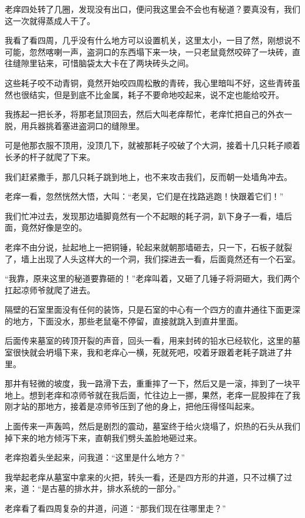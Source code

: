 老痒四处转了几圈，发现没有出口，便问我这里会不会也有秘道？要真没有，我们这一次就得蒸成人干了。

我看了看四周，几乎没有什么地方可以设置机关，这里太小，一目了然，刚想说不可能，忽然喀喇一声，盗洞口的东西塌下来一块，一只老鼠竟然咬碎了一块砖，直往缝隙里钻来，可惜脑袋太大卡在了两块砖头之间。

这些耗子咬不动青铜，竟然开始咬四周松散的青砖，我心里暗叫不好，这些青砖虽然也很结实，但是到底不比金属，耗子不要命地咬起来，说不定也能给咬开。

我拣起一把长矛，将那老鼠顶回去，然后大叫老痒帮忙，老痒忙把自己的外衣一脱，用兵器挑着塞进盗洞口的缝隙里。

可是他那衣服不顶用，没顶几下，就被那耗子咬破了个大洞，接着十几只耗子顺着长矛的杆子就爬了下来。

我们赶紧撒手，那几只耗子跳到地上，也不来攻击我们，反而朝一处墙角冲去。

老痒一看，忽然恍然大悟，大叫：“老吴，它们是在找路逃跑！快跟着它们！”

我们忙冲过去，发现那边墙脚竟然有一个不起眼的耗子洞，趴下身子一看，墙后面，竟然好像是空的。

老痒不由分说，扯起地上一把铜锤，轮起来就朝那墙砸去，只一下，石板子就裂了，墙上出现了人头这样大的一个洞，我们探进去一看，后面竟然还有一个石室。

“我靠，原来这里的秘道要靠砸的！”老痒叫着，又砸了几锤子将洞砸大，我们两个扛起凉师爷就爬了进去。

隔壁的石室里面没有任何的装饰，只是石室的中心有一个四方的直井通往下面更深的地方，下面没水，那些老鼠毫不停留，直接就跳入到直井里面。

后面传来墓室的砖顶开裂的声音，回头一看，用来封砖的铅水已经软化，这里的墓室很快就会坍塌下来，我和老痒心一横，死就死吧，咬着牙跟着老耗子跳进了井里。

那井有轻微的坡度，我一路滑下去，重重摔了一下，然后又是一滚，摔到了一块平地上。想到老痒和凉师爷就在我后面，忙往边上一挪，果然，老痒一屁股摔在了我刚才站的那地方，接着是凉师爷压到了他的身上，把他压得怪叫起来。

上面传来一声轰鸣，然后是剧烈的震动，墓室终于给火烧塌了，炽热的石头从我们掉下来的地方倾泻下来，直朝我们劈头盖脸地砸过来。

老痒抱着头坐起来，问我道：“这里是什么地方？”

我举起老痒从墓室中拿来的火把，转头一看，还是四方形的井道，只不过横了过来，道：“是古墓的排水井，排水系统的一部分。”

老痒看了看四周复杂的井道，问道：“那我们现在往哪里走？”

